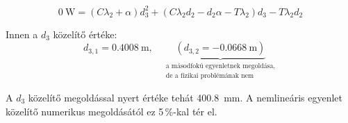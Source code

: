 \begin{equation}
	\SI{0}{\watt} = \left(C \lambda_2 +\alpha\right)d_3^2 + \left(C \lambda_2 d_2 - d_2 \alpha - T \lambda_2 \right) d_3 - T \lambda_2 d_2
\end{equation}

Innen a $d_3$ közelítő értéke:
\begin{equation}
	d_{3,1} = \SI{0.4008}{\meter}, 
	\quad 
	\underbrace{
		\left(d_{3,2} = \SI{-0.0668}{\meter}\right)
	}_{\substack{\text{a másodfokú egyenletnek megoldása,} \\ \text{de a fizikai problémának nem}}}
\end{equation}

A $d_3$ közelítő megoldással nyert értéke tehát \SI{400.8}{\milli\meter}. A nemlineáris egyenlet közelítő numerikus megoldásától ez 5\,\%-kal tér el.

\pagebreak